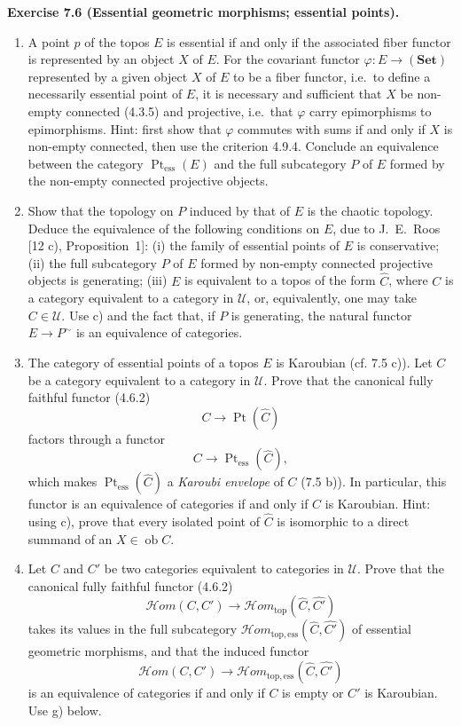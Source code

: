 \documentclass[11pt]{article}
\newcommand{\U}{\mathcal{U}}
\newcommand{\Set}{\mathbf{Set}}
\newcommand{\Ppoint}{\operatorname{Pt}}
\newcommand{\Hhom}{\mathcal{H}om}
\newcommand{\Hhomtop}{\mathcal{H}om_{\mathrm{top}}}
\newcommand{\ie}{i.e.}
\newenvironment{remarktext}[1]{\par\medskip\noindent\textbf{#1.}\ }{\par\medskip}
\providecommand{\ob}{\operatorname{ob}}
\providecommand{\Ppointess}{\operatorname{Pt}_{\mathrm{ess}}}
\providecommand{\Hhomtopess}{\mathcal{H}om_{\mathrm{top},\mathrm{ess}}}
\begin{document}
\begin{remarktext}{Exercise 7.6 (Essential geometric morphisms; essential points)}
\begin{enumerate}[label=\alph*)]
\item A point \(p\) of the topos \(E\) is essential if and only if the associated fiber functor is represented by an object \(X\) of \(E\). For the covariant functor \(\varphi:E\to(\Set)\) represented by a given object \(X\) of \(E\) to be a fiber functor, \ie\ to define a necessarily essential point of \(E\), it is necessary and sufficient that \(X\) be non-empty connected (4.3.5) and projective, \ie\ that \(\varphi\) carry epimorphisms to epimorphisms. Hint: first show that \(\varphi\) commutes with sums if and only if \(X\) is non-empty connected, then use the criterion 4.9.4. Conclude an equivalence between the category \(\Ppointess(E)\) and the full subcategory \(P\) of \(E\) formed by the non-empty connected projective objects.

\item Show that the topology on \(P\) induced by that of \(E\) is the chaotic topology. Deduce the equivalence of the following conditions on \(E\), due to J.~E.~Roos [12 c), Proposition~1]: (i) the family of essential points of \(E\) is conservative; (ii) the full subcategory \(P\) of \(E\) formed by non-empty connected projective objects is generating; (iii) \(E\) is equivalent to a topos of the form \(\widehat C\), where \(C\) is a category equivalent to a category in \(\U\), or, equivalently, one may take \(C\in\U\). Use c) and the fact that, if \(P\) is generating, the natural functor \(E\to P^{\sim}\) is an equivalence of categories.

\item The category of essential points of a topos \(E\) is Karoubian (cf. 7.5 c)). Let \(C\) be a category equivalent to a category in \(\U\). Prove that the canonical fully faithful functor (4.6.2)
\[
C\longrightarrow\Ppoint(\widehat C)
\]
factors through a functor
\[
C\longrightarrow\Ppointess(\widehat C),
\]
which makes \(\Ppointess(\widehat C)\) a \emph{Karoubi envelope} of \(C\) (7.5 b)). In particular, this functor is an equivalence of categories if and only if \(C\) is Karoubian. Hint: using c), prove that every isolated point of \(\widehat C\) is isomorphic to a direct summand of an \(X\in\ob C\).

\item Let \(C\) and \(C'\) be two categories equivalent to categories in \(\U\). Prove that the canonical fully faithful functor (4.6.2)
\[
\Hhom(C,C')\longrightarrow\Hhomtop(\widehat C,\widehat{C'})
\]
takes its values in the full subcategory \(\Hhomtopess(\widehat C,\widehat{C'})\) of essential geometric morphisms, and that the induced functor
\[
\Hhom(C,C')\longrightarrow\Hhomtopess(\widehat C,\widehat{C'})
\]
is an equivalence of categories if and only if \(C\) is empty or \(C'\) is Karoubian. Use g) below.


\end{enumerate}
\end{remarktext}
\end{document}
